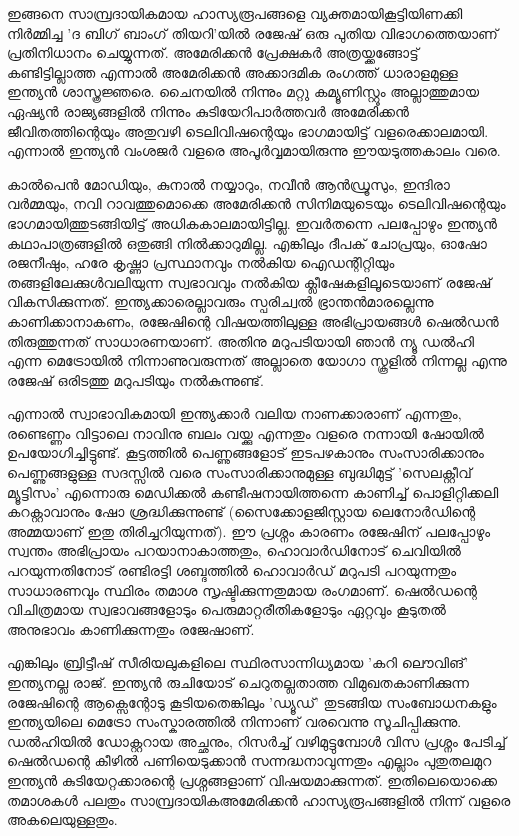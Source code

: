 ഇങ്ങനെ സാമ്പ്രദായികമായ ഹാസ്യരൂപങ്ങളെ വ്യക്തമായികൂട്ടിയിണക്കി നിര്‍മ്മിച്ച 'ദ ബിഗ് ബാംഗ് തിയറി'യില്‍ രജേഷ് ഒരു 
പുതിയ വിഭാഗത്തെയാണ് പ്രതിനിധാനം ചെയ്യുന്നത്. അമേരിക്കന്‍ പ്രേക്ഷകര്‍ അത്രയ്ക്കങ്ങോട്ട് കണ്ടിട്ടില്ലാത്ത എന്നാല്‍ അമേരിക്കന്‍ 
അക്കാദമിക രംഗത്ത് ധാരാളമുള്ള ഇന്ത്യന്‍ ശാസ്ത്രജ്ഞരെ. ചൈനയില്‍ നിന്നും മറ്റു കമ്യൂണിസ്റ്റൂം അല്ലാത്തുമായ ഏഷ്യന്‍ 
രാജ്യങ്ങളില്‍ നിന്നും കുടിയേറിപാര്‍ത്തവര്‍ അമേരിക്കന്‍ ജീവിതത്തിന്റെയും അതുവഴി ടെലിവിഷന്റെയും ഭാഗമായിട്ട് വളരെക്കാലമായി. 
എന്നാല്‍ ഇന്ത്യന്‍ വംശജര്‍ വളരെ അപൂര്‍വ്വമായിരുന്നു ഈയടുത്തകാലം വരെ.

കാല്‍പെന്‍ മോഡിയും, കുനാല്‍ നയ്യാറും, നവീന്‍ ആന്‍ഡ്രൂസും, ഇന്ദിരാ വര്‍മ്മയും, നവി റാവത്തുമൊക്കെ അമേരിക്കന്‍ 
സിനിമയുടെയും ടെലിവിഷന്റെയും ഭാഗമായിത്തുടങ്ങിയിട്ട് അധികകാലമായിട്ടില്ല. ഇവര്‍തന്നെ പലപ്പോഴും ഇന്ത്യന്‍ കഥാപാത്രങ്ങളില്‍ 
ഒതുങ്ങി നില്‍ക്കാറുമില്ല. എങ്കിലും ദീപക് ചോപ്രയും, ഓഷോ രജനീഷും, ഹരേ കൃഷ്ണാ പ്രസ്ഥാനവും നല്‍കിയ ഐഡന്റിറ്റിയും 
തങ്ങളിലേക്കുള്‍വലിയുന്ന സ്വഭാവവും നല്‍കിയ ക്ലീഷേകളിലൂടെയാണ് രജേഷ് വികസിക്കുന്നത്. ഇന്ത്യക്കാരെല്ലാവരും സ്പരിച്വല്‍ 
ഭ്രാന്തന്‍മാരല്ലെന്നു കാണിക്കാനാകണം, രജേഷിന്റെ വിഷയത്തിലുള്ള അഭിപ്രായങ്ങള്‍ ഷെല്‍ഡന്‍ തിരുത്തുന്നത് സാധാരണയാണ്.
 അതിനു മറുപടിയായി ഞാന്‍ ന്യൂ ഡല്‍ഹി എന്ന മെട്രോയില്‍ നിന്നാണുവരുന്നത് അല്ലാതെ യോഗാ സ്കൂളില്‍ നിന്നല്ല എന്നു 
 രജേഷ് ഒരിടത്തു മറുപടിയും നല്‍കുന്നുണ്ട്.



എന്നാല്‍ സ്വാഭാവികമായി ഇന്ത്യക്കാര്‍ വലിയ നാണക്കാരാണ് എന്നതും, രണ്ടെണ്ണം വിട്ടാലെ നാവിനു ബലം വയ്ക്കു എന്നതും 
വളരെ നന്നായി ഷോയില്‍ ഉപയോഗിച്ചിട്ടുണ്ട്. കൂട്ടത്തില്‍ പെണ്ണുങ്ങളോട് ഇടപഴകാനും സംസാരിക്കാനും പെണ്ണുങ്ങളുള്ള സദസ്സില്‍ 
വരെ സംസാരിക്കാനുമുള്ള ബുദ്ധിമുട്ട് 'സെലക്റ്റീവ് മ്യൂട്ടിസം' എന്നൊരു മെഡിക്കല്‍ കണ്ടീഷനായിത്തന്നെ കാണിച്ച് പൊളിറ്റിക്കലി
 കറക്റ്റാവാനും ഷോ ശ്രദ്ധിക്കുന്നുണ്ട് (സൈക്കോളജിസ്റ്റായ ലെനോര്‍ഡിന്റെ അമ്മയാണ് ഇതു തിരിച്ചറിയുന്നത്). ഈ പ്രശ്നം കാരണം
  രജേഷിന് പലപ്പോഴും സ്വന്തം അഭിപ്രായം പറയാനാകാത്തതും, ഹൊവാര്‍ഡിനോട് ചെവിയില്‍ പറയുന്നതിനോട് രണ്ടിരട്ടി 
  ശബ്ദത്തില്‍ ഹൊവാര്‍ഡ് മറുപടി പറയുന്നതും സാധാരണവും സ്ഥിരം തമാശ സൃഷ്ടിക്കുന്നതുമായ രംഗമാണ്. ഷെല്‍ഡന്റെ 
  വിചിത്രമായ സ്വഭാവങ്ങളോടും പെരുമാറ്റരീതികളോടും ഏറ്റവും കൂടുതല്‍ അനുഭാവം കാണിക്കുന്നതും രജേഷാണ്.

എങ്കിലും ബ്രിട്ടീഷ് സീരിയലുകളിലെ സ്ഥിരസാന്നിധ്യമായ 'കറി ലൌവിങ്' ഇന്ത്യനല്ല രാജ്. ഇന്ത്യന്‍ രുചിയോട് ചെറുതല്ലതാത്ത
 വിമുഖതകാണിക്കുന്ന രജേഷിന്റെ ആക്സെന്റോടു കൂടിയതെങ്കിലും 'ഡ്യൂഡ്' തുടങ്ങിയ സംബോധനകളും ഇന്ത്യയിലെ മെട്രോ
  സംസ്കാരത്തില്‍ നിന്നാണ് വരവെന്നു സൂചിപ്പിക്കുന്നു.
ഡല്‍ഹിയില്‍ ഡോക്റ്ററായ അച്ഛനും, റിസര്‍ച്ച് വഴിമുട്ടുമ്പോള്‍ വിസ പ്രശ്നം പേടിച്ച് ഷെല്‍ഡന്റെ കീഴില്‍ പണിയെടുക്കാന്‍ 
സന്നദ്ധനാവുന്നതും എല്ലാം പുതുതലമുറ ഇന്ത്യന്‍ കുടിയേറ്റക്കാരന്റെ പ്രശ്നങ്ങളാണ് വിഷയമാക്കുന്നത്. ഇതിലെയൊക്കെ തമാശകള്‍ 
പലതും സാമ്പ്രദായികഅമേരിക്കന്‍ ഹാസ്യരൂപങ്ങളില്‍ നിന്ന് വളരെ അകലെയുള്ളതും.

